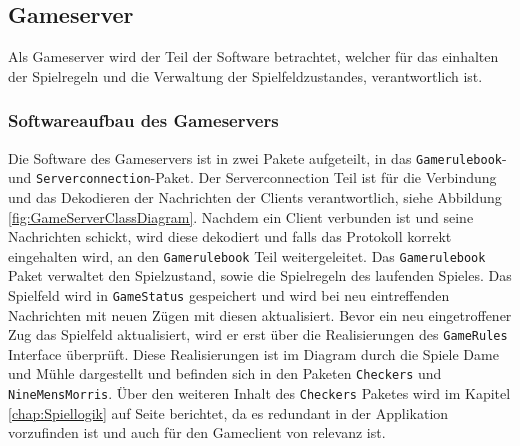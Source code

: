 \documentclass[12pt,a4paper,bibliography=totocnumbered,listof=totocnumbered]{article}
\begin{document}
\subsection{Gameserver}
Als Gameserver wird der Teil der Software betrachtet, welcher für das einhalten der Spielregeln und die Verwaltung der Spielfeldzustandes, 
verantwortlich ist. 

\subsubsection{Softwareaufbau des Gameservers}
Die Software des Gameservers ist in zwei Pakete aufgeteilt, in das \texttt{Gamerulebook}- und \texttt{Serverconnection}-Paket.
Der Serverconnection Teil ist für die Verbindung und das Dekodieren der Nachrichten der Clients verantwortlich, siehe Abbildung \ref{fig:GameServerClassDiagram}.
Nachdem ein Client verbunden ist und seine Nachrichten schickt, wird diese dekodiert und falls das Protokoll korrekt eingehalten wird,
an den \texttt{Gamerulebook} Teil weitergeleitet. Das \texttt{Gamerulebook} Paket verwaltet den Spielzustand, sowie die Spielregeln des laufenden Spieles.
Das Spielfeld wird in \texttt{GameStatus} gespeichert und wird bei neu eintreffenden Nachrichten mit neuen Zügen mit diesen aktualisiert.
Bevor ein neu eingetroffener Zug das Spielfeld aktualisiert, wird er erst über die Realisierungen des \texttt{GameRules} Interface überprüft.
Diese Realisierungen ist im Diagram durch die Spiele Dame und Mühle dargestellt und befinden sich in den Paketen \texttt{Checkers} und \texttt{NineMensMorris}.
Über den weiteren Inhalt des \texttt{Checkers} Paketes wird im Kapitel \ref{chap:Spiellogik} auf Seite \pageref{chap:Spiellogik} berichtet, da es 
redundant in der Applikation vorzufinden ist und auch für den Gameclient von relevanz ist.
\end{document}

